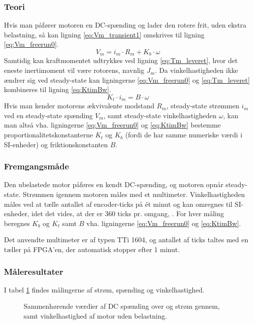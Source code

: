 \subsubsection{Teori}
Hvis man påfører motoren en DC-spænding og lader den rotere frit, uden ekstra belastning,
så kan ligning \ref{eq:Vm_transient1} omskrives til ligning \ref{eq:Vm_freerun0}.
\begin{equation}
	V_m=i_m\cdot{R_m}+K_b\cdot\omega
	\label{eq:Vm_freerun0}
 \end{equation}
Samtidig kan kraftmomentet udtrykkes ved ligning \ref{eq:Tm_leveret}, hvor det eneste inertimoment vil være
rotorens, navnlig \(J_m\).
Da vinkelhastigheden ikke ændrer sig ved steady-state kan ligningerne \ref{eq:Vm_freerun0} og \ref{eq:Tm_leveret} kombineres
til ligning \ref{eq:KtimBw}.
\begin{equation}
	K_t\cdot{i_m}=B\cdot\omega
	\label{eq:KtimBw}
 \end{equation}
Hvis man kender motorens ækvivalente modstand \(R_m\), steady-state strømmen \(i_m\) ved en steady-state spænding \(V_m\),
samt steady-state vinkelhastigheden \(\omega\), kan man altså vha. ligningerne \ref{eq:Vm_freerun0} og \ref{eq:KtimBw} bestemme
proportionalitetskonstanterne \(K_t\) og \(K_b\) (fordi de har samme numeriske værdi i SI-enheder) og friktionskonstanten \(B\).
\subsubsection{Fremgangsmåde}
Den ubelastede motor påføres en kendt DC-spænding, og motoren opnår steady-state.
Strømmen igennem motoren måles med et multimeter.
Vinkelhastigheden måles ved at tælle antallet af encoder-ticks på ét minut og kan omregnes til SI-enheder, 
idet det vides, at der er 360 ticks pr. omgang, \citep{emgmotor}.
For hver måling beregnes \(K_b\) og \(K_t\) samt \(B\) vha. ligningerne \ref{eq:Vm_freerun0} og \ref{eq:KtimBw}.

Det anvendte multimeter er af typen TTi 1604,
og antallet af ticks taltes med en tæller på FPGA'en, der automatisk stopper efter 1 minut.
\subsubsection{Måleresultater}
I tabel \ref{tb:steadystatenoload} findes målingerne af strøm, spænding og vinkelhastighed.
\begin{figure}[th!]
	\centering
	
	\captionsetup{type=table}
	\caption[Steady-state spænding, strøm og vinkelhastighed uden belastning]
			{Sammenhørende værdier af DC spænding over og strøm gennem, samt vinkelhastighed af motor uden belastning.}
	\label{tb:steadystatenoload}
\end{figure}
